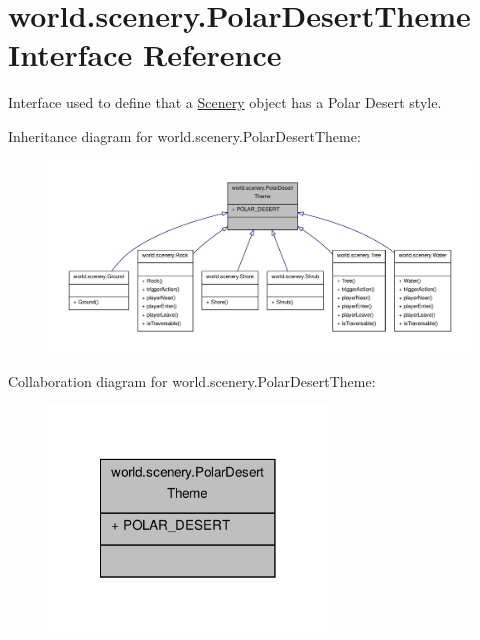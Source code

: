 \hypertarget{interfaceworld_1_1scenery_1_1_polar_desert_theme}{\section{world.\-scenery.\-Polar\-Desert\-Theme Interface Reference}
\label{interfaceworld_1_1scenery_1_1_polar_desert_theme}
}


Interface used to define that a \hyperlink{classworld_1_1scenery_1_1_scenery}{Scenery} object has a Polar Desert style.  




Inheritance diagram for world.\-scenery.\-Polar\-Desert\-Theme\-:\nopagebreak
\begin{figure}[H]
\begin{center}
\leavevmode
\includegraphics[width=350pt]{interfaceworld_1_1scenery_1_1_polar_desert_theme__inherit__graph}
\end{center}
\end{figure}


Collaboration diagram for world.\-scenery.\-Polar\-Desert\-Theme\-:\nopagebreak
\begin{figure}[H]
\begin{center}
\leavevmode
\includegraphics[width=210pt]{interfaceworld_1_1scenery_1_1_polar_desert_theme__coll__graph}
\end{center}
\end{figure}
